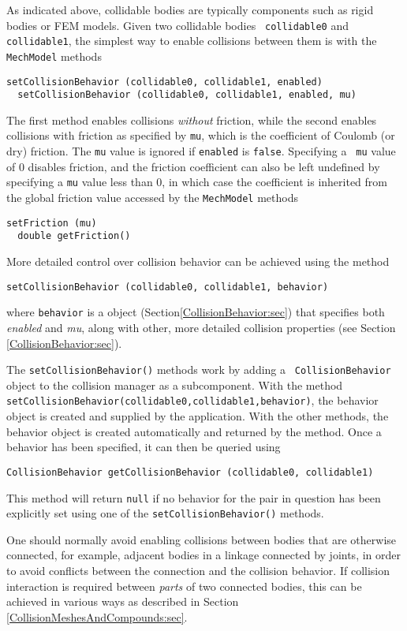 As indicated above, collidable bodies are typically components such as
rigid bodies or FEM models. Given two collidable bodies {\tt
collidable0} and {\tt collidable1}, the simplest way to enable
collisions between them is with the {\tt MechModel} methods
%
\begin{lstlisting}[]
  setCollisionBehavior (collidable0, collidable1, enabled)
  setCollisionBehavior (collidable0, collidable1, enabled, mu)
\end{lstlisting}
%
The first method enables collisions {\it without} friction, while the
second enables collisions with friction as specified by {\tt mu},
which is the coefficient of Coulomb (or dry) friction.  The {\tt mu}
value is ignored if {\tt enabled} is {\tt false}. Specifying a {\tt
mu} value of 0 disables friction, and the friction coefficient can
also be left undefined by specifying a {\tt mu} value less than 0, in
which case the coefficient is inherited from the global friction value
accessed by the {\tt MechModel} methods
%
\begin{lstlisting}[]
  setFriction (mu)
  double getFriction()
\end{lstlisting}
%
More detailed control over collision behavior can be achieved
using the method
%
\begin{lstlisting}[]
  setCollisionBehavior (collidable0, collidable1, behavior)
\end{lstlisting}
%
where {\tt behavior} is a
 object
(Section\ref{CollisionBehavior:sec}) that specifies both {\it enabled}
and {\it mu}, along with other, more detailed collision properties
(see Section \ref{CollisionBehavior:sec}).

The {\tt setCollisionBehavior()} methods work by adding a {\tt
CollisionBehavior} object to the collision manager as a
subcomponent. With the method {\tt
setCollisionBehavior(collidable0,collidable1,behavior)}, the behavior
object is created and supplied by the application.  With the other
methods, the behavior object is created automatically and returned by
the method. Once a behavior has been specified, it can then be queried
using
%
\begin{lstlisting}[]
  CollisionBehavior getCollisionBehavior (collidable0, collidable1)
\end{lstlisting}
%
This method will return {\tt null} if no behavior for the pair in
question has been explicitly set using one of the
\pdfbreak
{\tt setCollisionBehavior()} methods.

\begin{sideblock}
One should normally avoid enabling collisions between bodies that are
otherwise connected, for example, adjacent bodies in a linkage
connected by joints, in order to avoid conflicts between
the connection and the collision behavior. If collision interaction is
required between {\it parts} of two connected bodies, this can be
achieved in various ways as described in Section
\ref{CollisionMeshesAndCompounds:sec}.
\end{sideblock}

